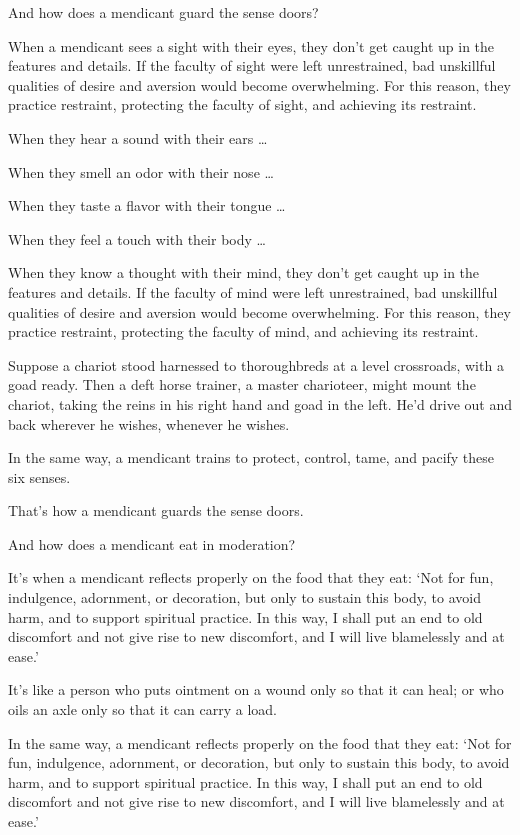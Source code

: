 \documentclass[12pt,openany]{book}%
\begin{document}
And how does a mendicant guard the sense doors? 

When a mendicant sees a sight with their eyes, they don’t get caught up in the features and details. If the faculty of sight were left unrestrained, bad unskillful qualities of desire and aversion would become overwhelming. For this reason, they practice restraint, protecting the faculty of sight, and achieving its restraint. 

When they hear a sound with their ears … 

When they smell an odor with their nose … 

When they taste a flavor with their tongue … 

When they feel a touch with their body … 

When they know a thought with their mind, they don’t get caught up in the features and details. If the faculty of mind were left unrestrained, bad unskillful qualities of desire and aversion would become overwhelming. For this reason, they practice restraint, protecting the faculty of mind, and achieving its restraint. 

Suppose a chariot stood harnessed to thoroughbreds at a level crossroads, with a goad ready. Then a deft horse trainer, a master charioteer, might mount the chariot, taking the reins in his right hand and goad in the left. He’d drive out and back wherever he wishes, whenever he wishes. 

In the same way, a mendicant trains to protect, control, tame, and pacify these six senses. 

That’s how a mendicant guards the sense doors. 

And how does a mendicant eat in moderation? 

It’s when a mendicant reflects properly on the food that they eat: ‘Not for fun, indulgence, adornment, or decoration, but only to sustain this body, to avoid harm, and to support spiritual practice. In this way, I shall put an end to old discomfort and not give rise to new discomfort, and I will live blamelessly and at ease.’ 

It’s like a person who puts ointment on a wound only so that it can heal; or who oils an axle only so that it can carry a load. 

In the same way, a mendicant reflects properly on the food that they eat: ‘Not for fun, indulgence, adornment, or decoration, but only to sustain this body, to avoid harm, and to support spiritual practice. In this way, I shall put an end to old discomfort and not give rise to new discomfort, and I will live blamelessly and at ease.’ 
\end{document}
